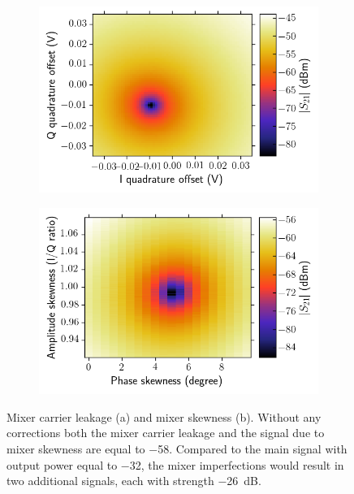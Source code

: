         \begin{figure}[tb]
          \centering
          \begin{subfigure}[h]{0.49\textwidth}
            \caption{}
            \includegraphics[width=\textwidth]{../Figures/Calibration routines/Mixer offset.png}
          \end{subfigure}
          \begin{subfigure}[h]{0.49\textwidth}
            \caption{}
            \includegraphics[width=\textwidth]{../Figures/Calibration routines/Mixer skewness.png}
          \end{subfigure}
          \caption{Mixer carrier leakage (a) and mixer skewness (b). Without any corrections both the mixer carrier leakage and the signal due to mixer skewness are equal to \SI{-58}{\dBm}. Compared to the main signal with output power equal to \SI{-32}{\dBm}, the mixer imperfections would result in two additional signals, each with strength \SI{-26}{\dB}.}
          \label{fig:Mixer calibrations 2D}
        \end{figure}

